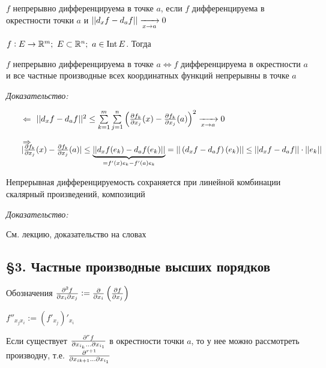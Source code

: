 \documentclass[12pt]{article}
\begin{document}
\begin{defin}{}
    $f$ непрерывно дифференцируема в точке $a$, если $f$ дифференцируема в окрестности точки $a$ и $|| d_xf - d_af || \xrightarrow[x \to a]{} 0$
\end{defin}

\begin{theo}{}
    $f : E \to \mathbb R^m;\ E \subset \mathbb R^n;\ a \in \operatorname{Int} E$. Тогда 

    $f$ непрерывно дифференцируема в точке $a \Leftrightarrow f$ дифференцируема в окрестности $a$ и все частные производные всех координатных функций непрерывны в точке $a$
\end{theo}

\textit{Доказательство:}

\begin{itemize}
    \item[$\Leftarrow$] $|| d_xf - d_af ||^2 \leq \sum\limits_{k = 1}^m \sum\limits_{j = 1}^n \left( \frac{\partial f_k}{\partial x_j}(x) - \frac{\partial f_k}{\partial x_j}(a) \right)^2 \xrightarrow[x \to a]{} 0$
    \item[$\Rightarrow$] $|\frac{\partial f_k}{\partial x_j}(x) - \frac{\partial f_k}{\partial x_j}(a)| \leq \underbrace{|| d_xf(e_k) - d_af(e_k) ||}_{= f'(x)e_k - f'(a)e_k} = || \left(d_xf - d_af\right)(e_k) || \leq || d_xf - d_af || \cdot || e_k ||$
\end{itemize}

\begin{theo}{}
    Непрерывная дифференцируемость сохраняется при линейной комбинации скалярный произведений, композиций 
\end{theo}

\textit{Доказательство:}

См. лекцию, доказательство на словах 

\subsection{\S 3. Частные производные высших порядков}

\begin{nota}{Обозначения}
    $\frac{\partial ^2f}{\partial x_i \partial x_j} := \frac{\partial }{\partial x_i}\left(\frac{\partial f}{\partial x_j}\right)$

    $f''_{x_jx_i} := \left(f'_{x_j}\right)'_{x_i}$

    Если существует $\frac{\partial ^rf}{\partial x_{i_k} \ldots \partial{x_{i_1}}}$ в окрестности точки $a$, то у нее можно рассмотреть производну, т.е. $\frac{\partial ^{r + 1}}{\partial x_{i{k + 1}} \ldots \partial{x_{i_1}}}$
\end{nota}
\end{document}

